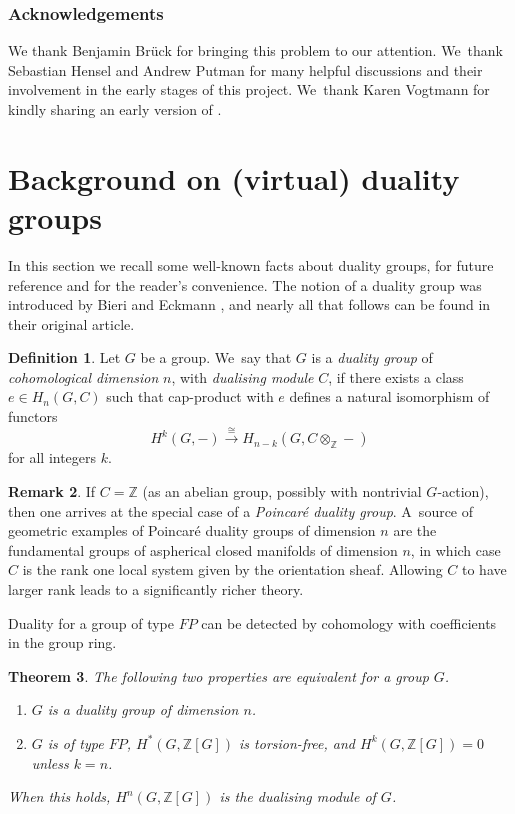 \documentclass[11pt]{article}
\theoremstyle{plain}
\newtheorem{thm}{Theorem}[section]
\theoremstyle{definition}
\newtheorem{rem}[thm]{Remark}
\newtheorem{defn}[thm]{Definition}
\newcommand{\Z}{\mathbb Z}
\begin{document}
\subsubsection*{Acknowledgements}
We thank Benjamin Brück for bringing this problem to our attention. We~thank Sebastian Hensel and Andrew Putman for many helpful discussions and their involvement in the early stages of this project. We~thank Karen Vogtmann for kindly sharing an early version of \cite{vogtmann}.

\section{Background on (virtual) duality groups}

In this section we recall some well-known facts about duality groups, for future reference and for the reader's convenience. The notion of a duality group was introduced by Bieri and Eckmann \cite{be}, and nearly all that follows can be found in their original article.

\begin{defn}
Let $G$ be a group. We~say that $G$ is a \emph{duality group} of \emph{cohomological dimension} $n$, with \emph{dualising module} $C$, if there exists a class $e \in H_n(G,C)$ such that cap-product with $e$ defines a natural isomorphism of functors\enlargethispage{.5\baselineskip}
\[
H^k(G,-) \stackrel \cong \longrightarrow H_{n-k}(G,C \otimes_\Z - )
\]
for all integers $k$.
\end{defn}

\begin{rem}If $C=\mathbb{Z}$ (as an abelian group, possibly with nontrivial $G$-action), then one arrives at the special case of a \emph{Poincaré duality group}. A~source of geometric examples of Poincaré duality groups of dimension $n$ are the fundamental groups of aspherical closed manifolds of dimension $n$, in which case $C$ is the rank one local system given by the orientation sheaf. Allowing $C$ to have larger rank leads to a significantly richer theory. \end{rem}

Duality for a group of type $\mathit{FP}$ can be detected by cohomology with coefficients in the group ring.

\pagebreak[2]

\begin{thm}\label{b-e criterion}
The following two properties are equivalent for a group $G$.
\begin{enumerate}
\item\label{b-e criterion1} $G$ is a duality group of dimension $n$.
\item\label{b-e criterion2} $G$ is of type $\mathit{FP}$, $H^*(G,\Z[G])$ is torsion-free, and $H^k(G,\Z[G])=0$ unless $k=n$.
\end{enumerate}
When this holds, $H^n(G,\Z[G])$ is the dualising module of $G$.
\end{thm}
\end{document}
